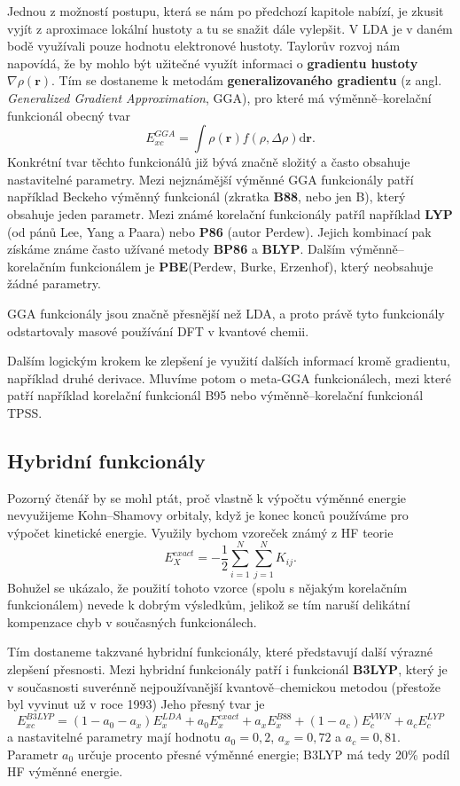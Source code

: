 Jednou z možností postupu, která se nám po předchozí kapitole nabízí, je zkusit vyjít z aproximace lokální hustoty a tu se snažit dále vylepšit. V LDA je v daném bodě využívali pouze hodnotu elektronové hustoty. Taylorův rozvoj nám napovídá, že by mohlo být užitečné využít informaci o \textbf{gradientu hustoty} $\nabla\rho(\textbf{r})$. 
Tím se dostaneme k metodám \textbf{generalizovaného gradientu} (z angl. \textit{Generalized Gradient Approximation}, GGA), pro které má výměnně--korelační funkcionál obecný tvar
\begin{equation}
E_{xc}^{GGA}=\int \rho(\textbf{r})f(\rho,\Delta\rho) \mathrm{d}\textbf{r} .
\end{equation}
Konkrétní tvar těchto funkcionálů již bývá značně složitý a často obsahuje nastavitelné parametry. Mezi nejznámější výměnné GGA funkcionály patří například Beckeho výměnný funkcionál (zkratka \textbf{B88}, nebo jen B), který obsahuje jeden parametr. Mezi známé korelační funkcionály patříl například \textbf{LYP} (od pánů Lee, Yang a Paara) nebo \textbf{P86} (autor Perdew). Jejich kombinací pak získáme známe často užívané metody \textbf{BP86} a \textbf{BLYP}. Dalším výměnně--korelačním funkcionálem je \textbf{PBE}(Perdew, Burke, Erzenhof), který neobsahuje žádné parametry.

GGA funkcionály jsou značně přesnější než LDA, a proto právě tyto funkcionály odstartovaly masové používání DFT v kvantové chemii.

Dalším logickým krokem ke zlepšení je využití dalších informací kromě gradientu, například druhé derivace. Mluvíme potom o meta-GGA funkcionálech, mezi které patří například korelační funkcionál B95 nebo výměnně--korelační funkcionál TPSS.

\subsection{Hybridní funkcionály}
Pozorný čtenář by se mohl ptát, proč vlastně k výpočtu výměnné energie nevyužijeme Kohn--Shamovy orbitaly, když je konec konců používáme pro výpočet kinetické energie. Využily bychom vzoreček známý z HF teorie 
\begin{equation}
E_X^{exact}=-\frac{1}{2}\sum_{i=1}^N\sum_{j=1}^N K_{ij} . 
\end{equation}
Bohužel se ukázalo, že použití tohoto vzorce (spolu s nějakým korelačním funkcionálem) nevede k dobrým výsledkům, jelikož se tím naruší delikátní kompenzace chyb v současných funkcionálech.

Tím dostaneme takzvané hybridní funkcionály, které představují další výrazné zlepšení přesnosti.
Mezi hybridní funkcionály patří i funkcionál \textbf{B3LYP}, který je v současnosti suverénně nejpoužívanější kvantově--chemickou metodou (přestože byl vyvinut už v roce 1993)
Jeho přesný tvar je
\begin{equation}
E_{xc}^{B3LYP}=(1-a_0-a_x)E_x^{LDA}+a_0E_x^{exact}+a_xE_x^{B88}+(1-a_c)E_c^{VWN}+a_c E_c^{LYP}
\end{equation}
a nastavitelné parametry mají hodnotu $a_0=0,2$, $a_x=0,72$ a $a_c=0,81$.
Parametr $a_0$ určuje procento přesné výměnné energie; B3LYP má tedy 20\% podíl HF výměnné energie.

